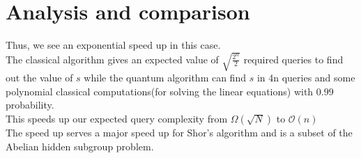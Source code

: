 \section{Analysis and comparison}
Thus, we see an exponential speed up in this case. \\
The classical algorithm gives an expected value of $\sqrt{\frac{2^n}{2}}$ required queries to find out the value of $s$ while the quantum algorithm can find $s$ in 4n queries and some polynomial classical computations(for solving the linear equations) with $0.99$ probability. \\
This speeds up our expected query complexity from $\Omega(\sqrt{N})$ to $\mathcal{O}(n)$ \\
The speed up serves a major speed up for Shor's algorithm and is a subset of the Abelian hidden subgroup problem.
